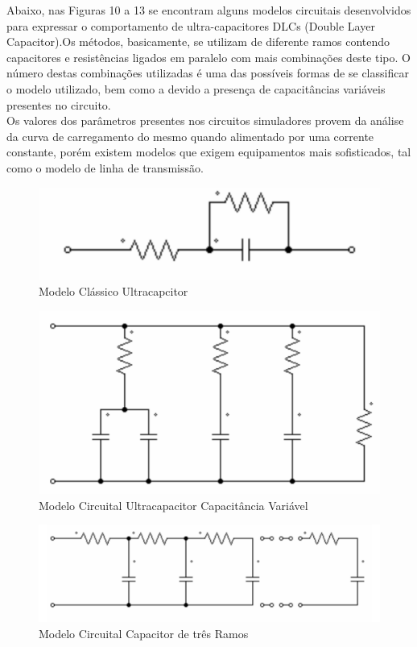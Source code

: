 \documentclass[11pt, a4paper, oneside]{article}
\begin{document}
\newpage

Abaixo, nas Figuras 10 a 13 se encontram alguns modelos circuitais
desenvolvidos para expressar o comportamento de ultra-capacitores DLCs (Double
Layer Capacitor).Os métodos, basicamente, se utilizam de diferente ramos
contendo capacitores e resistências ligados em paralelo com mais combinações
deste tipo. O número destas combinações utilizadas é uma das possíveis formas de
se classificar o modelo utilizado, bem como a devido a presença de capacitâncias
variáveis presentes no circuito.\\
Os valores dos parâmetros presentes nos circuitos simuladores provem da
análise da curva de carregamento do mesmo quando alimentado por uma corrente
constante, porém existem modelos que exigem equipamentos mais sofisticados, tal
como o modelo de linha de transmissão.\\

\begin{figure}[h!]
\centering
\includegraphics[width=.3\linewidth]{modelo_ultracap_1}
\caption{Modelo Clássico Ultracapcitor \cite{modelo_circuital}}
\label{fig:estrutura_equalizador_passivo_ apacitor}
\end{figure}

\begin{figure}[h!]
\centering
\includegraphics[width=.3\linewidth]{modelo_ultracap_2}
\caption{Modelo Circuital Ultracapacitor Capacitância Variável \cite{modelo_circuital}}
\label{fig:estrutura_equalizador_passivo_ apacitor}
\end{figure}

\begin{figure}[h!]
\centering
\includegraphics[width=.5\linewidth]{modelo_ultracap_3}
\caption{Modelo Circuital Capacitor de três Ramos \cite{modelo_circuital}}
\label{fig:estrutura_equalizador_passivo_ apacitor}
\end{figure}
\end{document}
